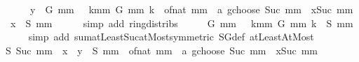 \begin{isabellebody}
\ \ \ \ \ \ y\ {\isacharasterisk}{\kern0pt}\ {\isacharparenleft}{\kern0pt}G\ mm\ {}\ {\isacharplus}{\kern0pt}\ {\isacharparenleft}{\kern0pt}{\isasymSum}k{\isacharequal}{\kern0pt}{}{\isachardot}{\kern0pt}{\isachardot}{\kern0pt}mm{\isachardot}{\kern0pt}\ {\isacharparenleft}{\kern0pt}G\ mm\ k{\isacharparenright}{\kern0pt}{\isacharparenright}{\kern0pt}{\isacharparenright}{\kern0pt}\ {\isacharplus}{\kern0pt}\ {\isacharparenleft}{\kern0pt}of{\isacharunderscore}{\kern0pt}nat\ mm\ {\isacharplus}{\kern0pt}\ a\ gchoose\ {\isacharparenleft}{\kern0pt}Suc\ mm{\isacharparenright}{\kern0pt}{\isacharparenright}{\kern0pt}\ {\isacharasterisk}{\kern0pt}\ x{\isacharcircum}{\kern0pt}{\isacharparenleft}{\kern0pt}Suc\ mm{\isacharparenright}{\kern0pt}\ {\isacharplus}{\kern0pt}\ x\ {\isacharasterisk}{\kern0pt}\ {\isacharparenleft}{\kern0pt}S\ mm{\isacharparenright}{\kern0pt}{\isachardoublequoteclose}\isanewline
\ \ \ \ \isamarkupfalse%
\ {\isacharparenleft}{\kern0pt}simp\ add{\isacharcolon}{\kern0pt}\ ring{\isacharunderscore}{\kern0pt}distribs{\isacharparenright}{\kern0pt}\isanewline
\ \ \isamarkupfalse%
\ \isamarkupfalse%
\ {\isachardoublequoteopen}G\ mm\ {}\ {\isacharplus}{\kern0pt}\ {\isacharparenleft}{\kern0pt}{\isasymSum}k{\isacharequal}{\kern0pt}{}{\isachardot}{\kern0pt}{\isachardot}{\kern0pt}mm{\isachardot}{\kern0pt}\ {\isacharparenleft}{\kern0pt}G\ mm\ k{\isacharparenright}{\kern0pt}{\isacharparenright}{\kern0pt}\ {\isacharequal}{\kern0pt}\ S\ mm{\isachardoublequoteclose}\isanewline
\ \ \ \ \isamarkupfalse%
\ {\isacharparenleft}{\kern0pt}simp\ add{\isacharcolon}{\kern0pt}\ sum{\isachardot}{\kern0pt}atLeast{\isacharunderscore}{\kern0pt}Suc{\isacharunderscore}{\kern0pt}atMost{\isacharbrackleft}{\kern0pt}symmetric{\isacharbrackright}{\kern0pt}\ SG{\isacharunderscore}{\kern0pt}def\ atLeast{}AtMost{\isacharparenright}{\kern0pt}\isanewline
\ \ \isamarkupfalse%
\ \isamarkupfalse%
\ {\isachardoublequoteopen}S\ {\isacharparenleft}{\kern0pt}Suc\ mm{\isacharparenright}{\kern0pt}\ {\isacharequal}{\kern0pt}\ {\isacharparenleft}{\kern0pt}x\ {\isacharplus}{\kern0pt}\ y{\isacharparenright}{\kern0pt}\ {\isacharasterisk}{\kern0pt}\ {\isacharparenleft}{\kern0pt}S\ mm{\isacharparenright}{\kern0pt}\ {\isacharplus}{\kern0pt}\ {\isacharparenleft}{\kern0pt}of{\isacharunderscore}{\kern0pt}nat\ mm\ {\isacharplus}{\kern0pt}\ a\ gchoose\ {\isacharparenleft}{\kern0pt}Suc\ mm{\isacharparenright}{\kern0pt}{\isacharparenright}{\kern0pt}\ {\isacharasterisk}{\kern0pt}\ x{\isacharcircum}{\kern0pt}{\isacharparenleft}{\kern0pt}Suc\ mm{\isacharparenright}{\kern0pt}{\isachardoublequoteclose}\isanewline

\end{isabellebody}
